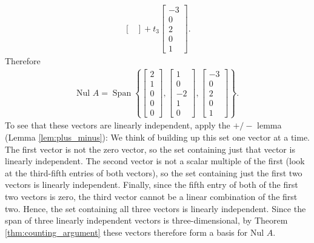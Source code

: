 \documentclass[12pt,letterpaper,reqno]{article}
\numberwithin{equation}{section}
\newcommand{\Nul}{\text{Nul }}
\DeclareMathOperator{\Span}{Span}
\newcommand{\fixme}[1]{{\color{orange}{[#1]}}}
\begin{document}
\begin{example}
\begin{align*}
\begin{bmatrix}
	\end{bmatrix}+t_3\begin{bmatrix}
		-3 \\ 0 \\ 2 \\ 0 \\1
	\end{bmatrix}.
\end{align*}
Therefore
\begin{align*}
	\Nul A=\Span\left\{\begin{bmatrix}
		2 \\ 1 \\ 0 \\ 0 \\0
	\end{bmatrix},\begin{bmatrix}
		1 \\ 0 \\ -2 \\ 1 \\0
	\end{bmatrix},\begin{bmatrix}
		-3 \\ 0 \\ 2 \\ 0 \\1
	\end{bmatrix}\right\}.
\end{align*}
To see that these vectors are linearly independent, apply the $+/-$ lemma (Lemma \ref{lem:plus_minus}): We think of building up this set one vector at a time. The first vector is not the zero vector, so the set containing just that vector is linearly independent. The second vector is not a scalar multiple of the first (look at the third-fifth entries of both vectors), so the set containing just the first two vectors is linearly independent. Finally, since the fifth entry of both of the first two vectors is zero, the third vector cannot be a linear combination of the first two. Hence, the set containing all three vectors is linearly independent. Since the span of three linearly independent vectors is three-dimensional, by Theorem \ref{thm:counting_argument} these vectors therefore form a basis for $\Nul A$. \fixme{Is this example really the best illustration of this theorem?}
\end{example}

\begin{thm}\label{thm:basis_for_nul_a}
	
\end{thm}
\end{document}
